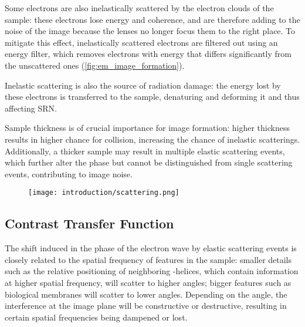 Some electrons are also inelastically scattered by the electron clouds of the sample: these electrons lose energy and coherence, and are therefore adding to the noise of the image because the lenses no longer focus them to the right place.
To mitigate this effect, inelastically scattered electrons are filtered out using an energy filter, which removes electrons with energy that differs significantly from the unscattered ones (\autoref{fig:em_image_formation}).

Inelastic scattering is also the source of radiation damage: the energy lost by these electrons is transferred to the sample, denaturing and deforming it and thus affecting SRN.

Sample thickness is of crucial importance for image formation: higher thickness results in higher chance for collision, increasing the chance of inelastic scatterings.
Additionally, a thicker sample may result in multiple elastic scattering events, which further alter the phase but cannot be distinguished from single scattering events, contributing to image noise.

\begin{figure}[ht]
    \centering
    \texttt{[image: introduction/scattering.png]}
    \label{fig:em_image_formation}
\end{figure}

\subsection{Contrast Transfer Function}\label{em_ctf}
The shift induced in the phase of the electron wave by elastic scattering events is closely related to the spatial frequency of features in the sample: smaller details such as the relative positioning of neighboring \alpha-helices, which contain information at higher spatial frequency, will scatter to higher angles; bigger features such as biological membranes will scatter to lower angles.
Depending on the angle, the interference at the image plane will be constructive or destructive, resulting in certain spatial frequencies being dampened or lost.

